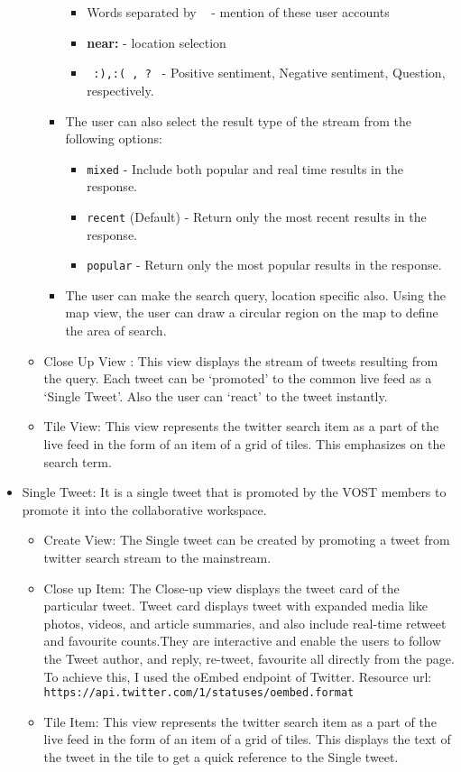 \begin{itemize}
\begin{itemize}
\begin{itemize}
\begin{itemize}
		\item Words separated by \texttt{ \@} - mention of these user accounts 
		\item \textbf{near:} - location selection 
		\item \texttt{ :),:( , ? } - Positive sentiment, Negative sentiment, Question, respectively.		
		\end{itemize}
		\item The user can also select the result type of the stream from the following options: 
		\begin{itemize}
		\item \texttt{mixed} - Include both popular and real time results in the response.
		\item \texttt{recent} (Default) - Return only the most recent results in the response.
		\item \texttt{popular} - Return only the most popular results in the response.
		
		\end{itemize}
		\item The user can make the search query, location specific also. Using the map view, the user can draw a circular region on the map to define the area of search.
	\end{itemize}
		\item Close Up View : This view displays the stream of tweets resulting from the query. Each tweet can be ‘promoted’ to the common live feed as a ‘Single Tweet’. Also the user can ‘react’ to the tweet instantly.
		\item Tile View: This view represents the twitter search item as a part of the live feed in the form of an item of a grid of tiles. This emphasizes on the search term.
	\end{itemize}	
	\item Single Tweet: It is a single tweet that is promoted by the VOST members to promote it into the collaborative workspace.
		\begin{itemize}
			\item Create View: The Single tweet can be created by promoting a tweet from twitter search stream to the mainstream.
			\item Close up Item: The Close-up view displays the tweet card of the particular tweet. Tweet card displays tweet with expanded media like photos, videos, and article summaries, and also include real-time retweet and favourite counts.They are interactive and enable the users to follow the Tweet author, and reply, re-tweet, favourite all directly from the page. To achieve this, I used the  oEmbed endpoint of Twitter. Resource url: \texttt{https://api.twitter.com/1/statuses/oembed.format}
			\item Tile Item: This view represents the twitter search item as a part of the live feed in the form of an item of a grid of tiles. This displays the text of the tweet in the tile to get a quick reference to the Single tweet.
		\end{itemize}
	
\end{itemize}


